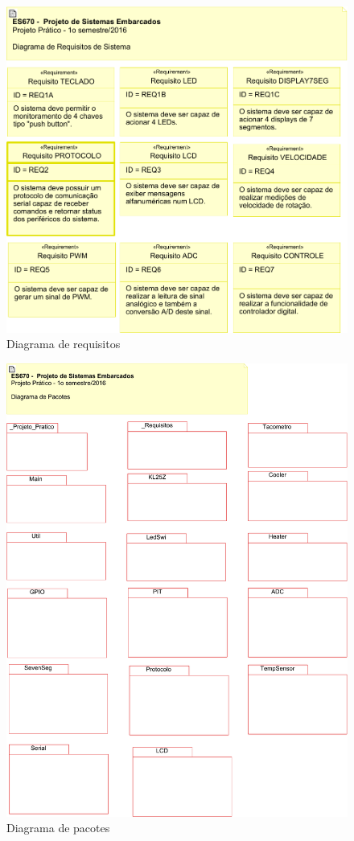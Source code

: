 \documentclass{article}
\begin{document}
\begin{figure}[H]
	\centering
	\includegraphics[width=0.9\linewidth]{requisitos}
	\caption{Diagrama de requisitos}
	\label{fig:requisitos}
\end{figure}
\begin{figure}[H]
	\centering
	\includegraphics[width=0.9\linewidth]{pacotes}
	\caption{Diagrama de pacotes}
	\label{fig:pacotes}
\end{figure}
\end{document}
